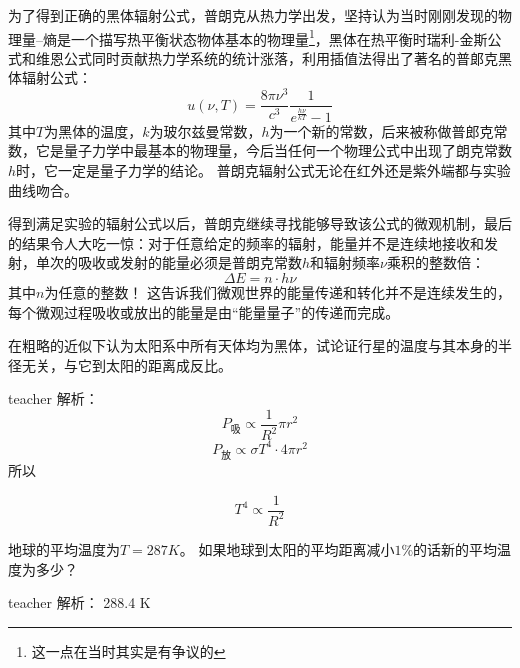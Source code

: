 为了得到正确的黑体辐射公式，普朗克从热力学出发，坚持认为当时刚刚发现的物理量--熵是一个描写热平衡状态物体基本的物理量\footnote{这一点在当时其实是有争议的}，黑体在热平衡时瑞利-金斯公式和维恩公式同时贡献热力学系统的统计涨落，利用插值法得出了著名的普郞克黑体辐射公式：
\begin{equation}
u(\nu,T)=\frac{8\pi\nu^3}{c^3}\frac{1}{e^{\frac{h\nu}{kT}}-1}
\end{equation}
其中$T$为黑体的温度，$k$为玻尔兹曼常数，$h$为一个新的常数，后来被称做普郎克常数，它是量子力学中最基本的物理量，今后当任何一个物理公式中出现了朗克常数$h$时，它一定是量子力学的结论。
普朗克辐射公式无论在红外还是紫外端都与实验曲线吻合。

得到满足实验的辐射公式以后，普朗克继续寻找能够导致该公式的微观机制，最后的结果令人大吃一惊：对于任意给定的频率的辐射，能量并不是连续地接收和发射，单次的吸收或发射的能量必须是普朗克常数$h$和辐射频率$\nu$乘积的整数倍：
\begin{equation}
\Delta E = n\cdot h\nu
\end{equation}
其中$n$为任意的整数！
这告诉我们微观世界的能量传递和转化并不是连续发生的，每个微观过程吸收或放出的能量是由“能量量子”的传递而完成。



\begin{example}
在粗略的近似下认为太阳系中所有天体均为黑体，试论证行星的温度与其本身的半径无关，与它到太阳的距离成反比。
\begin{taggedblock}{teacher}
\noindent
解析：
\[
P_吸 \propto \frac 1 {R^2} \pi r^2
\]
\[
P_放 \propto \sigma T^4 \cdot 4 \pi r^2
\]
所以

\[
T^4 \propto \frac 1 {R^2}
\]
\end{taggedblock}
\end{example}
%
\begin{example}
地球的平均温度为$T = 287\unit{K}$。
如果地球到太阳的平均距离减小$1\%$的话新的平均温度为多少？
\begin{taggedblock}{teacher}
\noindent
解析：
288.4 K
\end{taggedblock}
\end{example}


